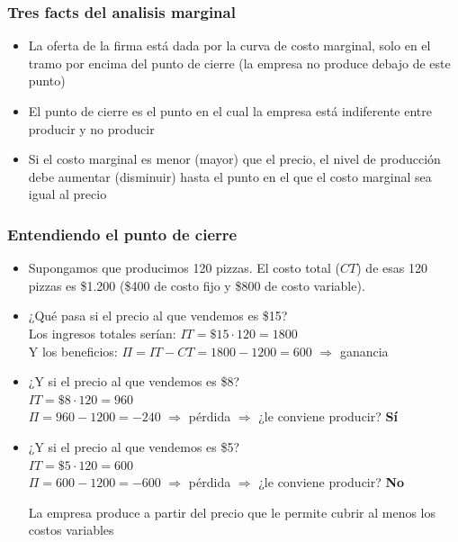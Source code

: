 \documentclass{beamer}
\begin{document}
\begin{frame}
    \frametitle{Tres facts del analisis marginal}
    \begin{itemize}
        \item La oferta de la firma está dada por la curva de costo marginal, solo en el tramo por encima del punto de cierre (la empresa no produce debajo de este punto)
        \item El punto de cierre es el punto en el cual la empresa está indiferente entre producir y no producir
        \item Si el costo marginal es menor (mayor) que el precio, el nivel de producción debe aumentar (disminuir) hasta el punto en el que el costo marginal sea igual al precio
    \end{itemize}
\end{frame}

\begin{frame}
    \frametitle{Entendiendo el punto de cierre}
    \begin{itemize}
        \item Supongamos que producimos 120 pizzas. El costo total ($CT$) de esas 120 pizzas es \$1.200 (\$400 de costo fijo y \$800 de costo variable). 
        \item ¿Qué pasa si el precio al que vendemos es \$15? \\ \pause
        Los ingresos totales serían: $IT=\$15 \cdot 120 = 1800$
        \\ 
        Y los beneficios: $\Pi= IT -CT=1800-1200=600 $ $\Rightarrow$ ganancia \pause
        \item ¿Y si el precio al que vendemos es \$8? \\ \pause
        $IT = \$8 \cdot 120 = 960$
        \\ 
        $\Pi = 960-1200=-240 $ $\Rightarrow$ pérdida $\Rightarrow$ ¿le conviene producir? \pause \textbf{Sí} \pause
        \item ¿Y si el precio al que vendemos es \$5? \\ \pause
        $IT = \$5 \cdot 120 = 600$
        \\ 
        $\Pi = 600-1200=-600 $ $\Rightarrow$ pérdida $\Rightarrow$ ¿le conviene producir? \pause \textbf{No} \pause
            \begin{boxB}
            \centering
            La empresa produce a partir del precio que le permite cubrir al menos los costos variables
        \end{boxB}
    \end{itemize}
\end{frame}
\end{document}
